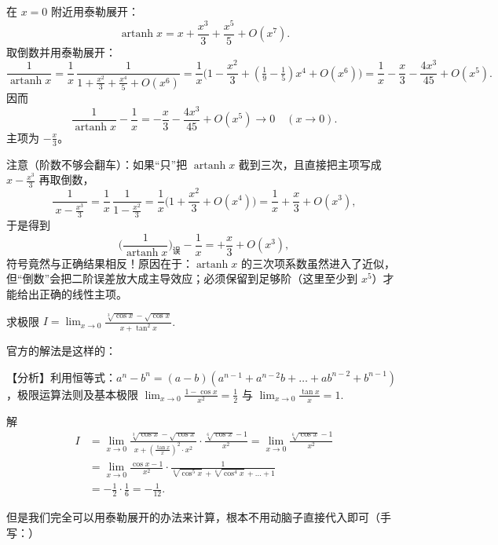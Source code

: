\documentclass[lang=cn,newtx,10pt,scheme=chinese]{elegantbook}
\DeclareMathOperator{\artanh}{artanh}
\begin{document}
\begin{solution}
  在 $x=0$ 附近用泰勒展开：
  \begin{equation*}
    \artanh x = x + \frac{x^{3}}{3} + \frac{x^{5}}{5} + O(x^{7}).
  \end{equation*}
  取倒数并用泰勒展开：
  \begin{equation*}
    \frac{1}{\artanh x}
    = \frac{1}{x}\,\frac{1}{1+\frac{x^{2}}{3}+\frac{x^{4}}{5}+O(x^{6})}
    = \frac{1}{x}\Big(1-\frac{x^{2}}{3} + (\tfrac{1}{9}-\tfrac{1}{5})x^{4} + O(x^{6})\Big)
    = \frac{1}{x} - \frac{x}{3} - \frac{4x^{3}}{45} + O(x^{5}).
  \end{equation*}
  因而
  \begin{equation*}
    \frac{1}{\artanh x} - \frac{1}{x} = -\frac{x}{3} - \frac{4x^{3}}{45} + O(x^{5}) \to 0\quad (x\to 0).
  \end{equation*}
  主项为 $-\tfrac{x}{3}$。

  注意（阶数不够会翻车）：如果“只”把 $\artanh x$ 截到三次，且直接把主项写成 $x-\tfrac{x^{3}}{3}$ 再取倒数，
  \begin{equation*}
    \frac{1}{\;x-\tfrac{x^{3}}{3}\;} = \frac{1}{x}\,\frac{1}{1-\tfrac{x^{2}}{3}} = \frac{1}{x}\Big(1+\frac{x^{2}}{3}+O(x^{4})\Big)
    = \frac{1}{x} + \frac{x}{3} + O(x^{3}),
  \end{equation*}
  于是得到
  \begin{equation*}
    \Big(\frac{1}{\artanh x}\Big)_{\text{误}} - \frac{1}{x} = +\frac{x}{3} + O(x^{3}),
  \end{equation*}
  符号竟然与正确结果相反！原因在于：$\artanh x$ 的三次项系数虽然进入了近似，但“倒数”会把二阶误差放大成主导效应；必须保留到足够阶（这里至少到 $x^{5}$）才能给出正确的线性主项。
\end{solution}

\begin{example}
  求极限 $I = \lim_{x \to 0} \frac{\sqrt[3]{\cos x} - \sqrt{\cos x}}{x + \tan^2 x}$.
\end{example}
官方的解法是这样的：
\begin{solution}
  【分析】利用恒等式：$a^n - b^n = (a - b)(a^{n-1} + a^{n-2}b + \dots + ab^{n-2} + b^{n-1})$，极限运算法则及基本极限 $\lim_{x \to 0} \frac{1 - \cos x}{x^2} = \frac{1}{2}$ 与 $\lim_{x \to 0} \frac{\tan x}{x} = 1$.

  解
  $$
  \begin{aligned}
  I &= \lim_{x \to 0} \frac{\sqrt[3]{\cos x} - \sqrt{\cos x}}{x + \left(\frac{\tan x}{x}\right)^2 \cdot x^2} \cdot \frac{\sqrt[6]{\cos x} - 1}{x^2} = \lim_{x \to 0} \frac{\sqrt[6]{\cos x} - 1}{x^2} \\
  &= \lim_{x \to 0} \frac{\cos x - 1}{x^2} \cdot \frac{1}{\sqrt[6]{\cos^5 x} + \sqrt[6]{\cos^4 x} + \dots + 1} \\
  &= -\frac{1}{2} \cdot \frac{1}{6} = -\frac{1}{12}.
  \end{aligned}
  $$

  但是我们完全可以用泰勒展开的办法来计算，根本不用动脑子直接代入即可（手写：）

  
\end{solution}
\end{document}
